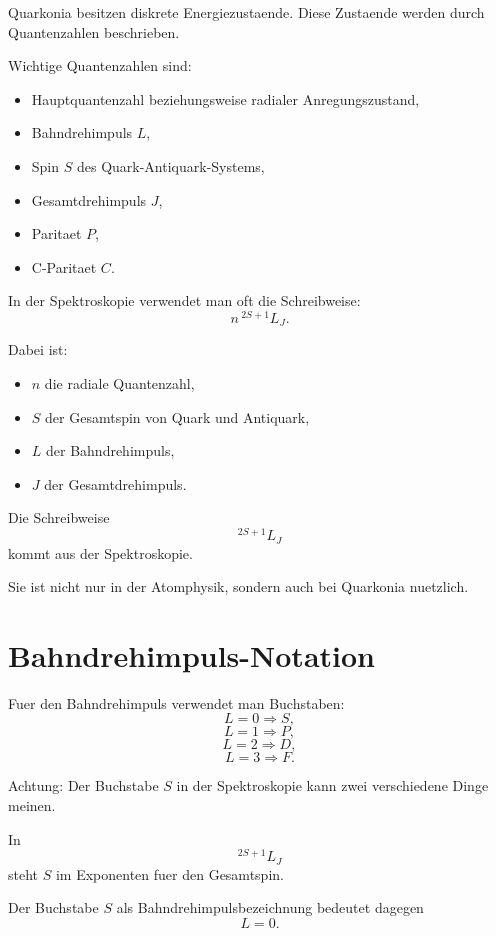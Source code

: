 Quarkonia besitzen diskrete Energiezustaende.
Diese Zustaende werden durch Quantenzahlen beschrieben.

\begin{conceptbox}
Wichtige Quantenzahlen sind:
\begin{itemize}
    \item Hauptquantenzahl beziehungsweise radialer Anregungszustand,
    \item Bahndrehimpuls $L$,
    \item Spin $S$ des Quark-Antiquark-Systems,
    \item Gesamtdrehimpuls $J$,
    \item Paritaet $P$,
    \item C-Paritaet $C$.
\end{itemize}
\end{conceptbox}

\begin{notebox}
In der Spektroskopie verwendet man oft die Schreibweise:
\[
    n\,{}^{2S+1}L_J.
\]

Dabei ist:
\begin{itemize}
    \item $n$ die radiale Quantenzahl,
    \item $S$ der Gesamtspin von Quark und Antiquark,
    \item $L$ der Bahndrehimpuls,
    \item $J$ der Gesamtdrehimpuls.
\end{itemize}
\end{notebox}

\begin{examtipbox}
Die Schreibweise
\[
    {}^{2S+1}L_J
\]
kommt aus der Spektroskopie.

Sie ist nicht nur in der Atomphysik, sondern auch bei Quarkonia nuetzlich.
\end{examtipbox}

\section{Bahndrehimpuls-Notation}

\begin{notebox}
Fuer den Bahndrehimpuls verwendet man Buchstaben:
\[
    L=0 \Rightarrow S,
\]
\[
    L=1 \Rightarrow P,
\]
\[
    L=2 \Rightarrow D,
\]
\[
    L=3 \Rightarrow F.
\]
\end{notebox}

\begin{conceptbox}
Achtung:
Der Buchstabe $S$ in der Spektroskopie kann zwei verschiedene Dinge meinen.

In
\[
    {}^{2S+1}L_J
\]
steht $S$ im Exponenten fuer den Gesamtspin.

Der Buchstabe $S$ als Bahndrehimpulsbezeichnung bedeutet dagegen
\[
    L=0.
\]
\end{conceptbox}

